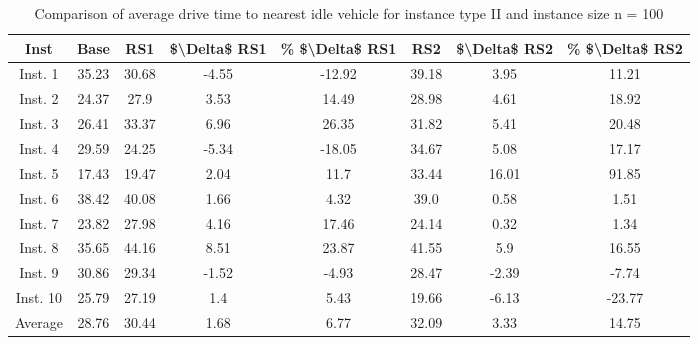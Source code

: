 \begin{table}[H]
\centering
\begin{tabular}{cccccccc}
  \hline
  \textbf{Inst} & \textbf{Base} & \textbf{RS1} & \textbf{\$\textbackslash{}Delta\$  RS1} & \textbf{\% \$\textbackslash{}Delta\$  RS1} & \textbf{RS2} & \textbf{\$\textbackslash{}Delta\$  RS2} & \textbf{\% \$\textbackslash{}Delta\$  RS2} \\\hline
  Inst. 1 & 35.23 & 30.68 & -4.55 & -12.92 & 39.18 & 3.95 & 11.21 \\
  Inst. 2 & 24.37 & 27.9 & 3.53 & 14.49 & 28.98 & 4.61 & 18.92 \\
  Inst. 3 & 26.41 & 33.37 & 6.96 & 26.35 & 31.82 & 5.41 & 20.48 \\
  Inst. 4 & 29.59 & 24.25 & -5.34 & -18.05 & 34.67 & 5.08 & 17.17 \\
  Inst. 5 & 17.43 & 19.47 & 2.04 & 11.7 & 33.44 & 16.01 & 91.85 \\
  Inst. 6 & 38.42 & 40.08 & 1.66 & 4.32 & 39.0 & 0.58 & 1.51 \\
  Inst. 7 & 23.82 & 27.98 & 4.16 & 17.46 & 24.14 & 0.32 & 1.34 \\
  Inst. 8 & 35.65 & 44.16 & 8.51 & 23.87 & 41.55 & 5.9 & 16.55 \\
  Inst. 9 & 30.86 & 29.34 & -1.52 & -4.93 & 28.47 & -2.39 & -7.74 \\
  Inst. 10 & 25.79 & 27.19 & 1.4 & 5.43 & 19.66 & -6.13 & -23.77 \\
  Average & 28.76 & 30.44 & 1.68 & 6.77 & 32.09 & 3.33 & 14.75 \\\hline
\end{tabular}
\caption{Comparison of average drive time to nearest idle vehicle for instance type II and instance size n = 100}
\label{tab:wait:resrelocation-nearest-drive-time-comparison_II_100}
\end{table}
